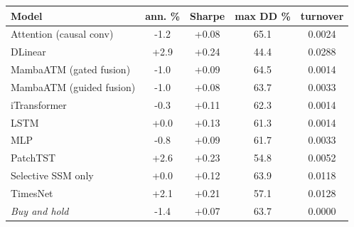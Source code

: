 {\footnotesize
\setlength{\tabcolsep}{3pt}
\begin{tabular}{lcccc}
\toprule
\textbf{Model} & \textbf{ann. \%} & \textbf{Sharpe} & \textbf{max DD \%} & \textbf{turnover} \\
\midrule
Attention (causal conv) & -1.2 & +0.08 & 65.1 & 0.0024 \\
DLinear & +2.9 & +0.24 & 44.4 & 0.0288 \\
MambaATM (gated fusion) & -1.0 & +0.09 & 64.5 & 0.0014 \\
MambaATM (guided fusion) & -1.0 & +0.08 & 63.7 & 0.0033 \\
iTransformer & -0.3 & +0.11 & 62.3 & 0.0014 \\
LSTM & +0.0 & +0.13 & 61.3 & 0.0014 \\
MLP & -0.8 & +0.09 & 61.7 & 0.0033 \\
PatchTST & +2.6 & +0.23 & 54.8 & 0.0052 \\
Selective SSM only & +0.0 & +0.12 & 63.9 & 0.0118 \\
TimesNet & +2.1 & +0.21 & 57.1 & 0.0128 \\
\emph{Buy and hold} & -1.4 & +0.07 & 63.7 & 0.0000 \\
\bottomrule
\end{tabular}
}

